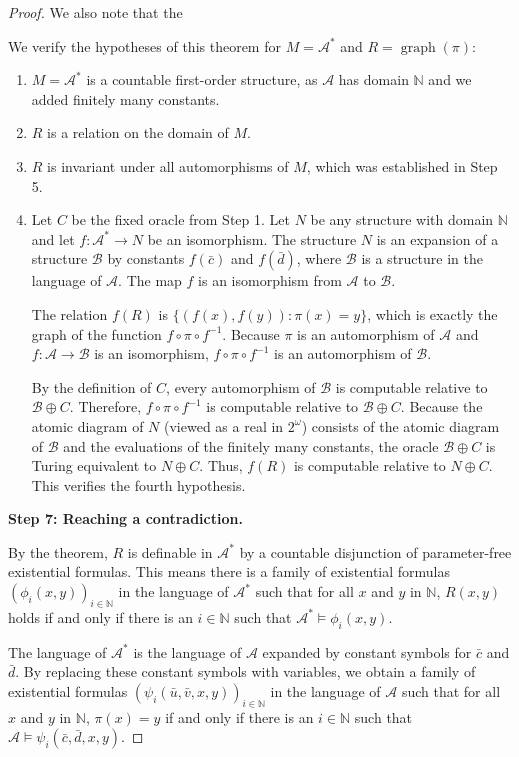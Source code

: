 \documentclass[12pt]{article}
\begin{document}
\begin{proof}
{We also note that the }

We verify the hypotheses of this theorem for $M = \mathcal{A}^*$ and $R = \operatorname{graph}(\pi)$:
\begin{enumerate}
\item $M = \mathcal{A}^*$ is a countable first-order structure, as $\mathcal{A}$ has domain $\mathbb{N}$ and we added finitely many constants.
\item $R$ is a relation on the domain of $M$.
\item $R$ is invariant under all automorphisms of $M$, which was established in Step 5.
\item Let $C$ be the fixed oracle from Step 1. Let $N$ be any structure with domain $\mathbb{N}$ and let $f: \mathcal{A}^* \to N$ be an isomorphism. The structure $N$ is an expansion of a structure $\mathcal{B}$ by constants $f(\bar{c})$ and $f(\bar{d})$, where $\mathcal{B}$ is a structure in the language of $\mathcal{A}$. The map $f$ is an isomorphism from $\mathcal{A}$ to $\mathcal{B}$. 

The relation $f(R)$ is $\{ (f(x), f(y)) : \pi(x) = y \}$, which is exactly the graph of the function $f \circ \pi \circ f^{-1}$. Because $\pi$ is an automorphism of $\mathcal{A}$ and $f: \mathcal{A} \to \mathcal{B}$ is an isomorphism, $f \circ \pi \circ f^{-1}$ is an automorphism of $\mathcal{B}$. 

By the definition of $C$, every automorphism of $\mathcal{B}$ is computable relative to $\mathcal{B} \oplus C$. Therefore, $f \circ \pi \circ f^{-1}$ is computable relative to $\mathcal{B} \oplus C$. Because the atomic diagram of $N$ (viewed as a real in $2^\omega$) consists of the atomic diagram of $\mathcal{B}$ and the evaluations of the finitely many constants, the oracle $\mathcal{B} \oplus C$ is Turing equivalent to $N \oplus C$. Thus, $f(R)$ is computable relative to $N \oplus C$. This verifies the fourth hypothesis.
\end{enumerate}

\textbf{Step 7: Reaching a contradiction.}

By the theorem, $R$ is definable in $\mathcal{A}^*$ by a countable disjunction of parameter-free existential formulas. This means there is a family of existential formulas $(\phi_i(x,y))_{i \in \mathbb{N}}$ in the language of $\mathcal{A}^*$ such that for all $x$ and $y$ in $\mathbb{N}$, $R(x, y)$ holds if and only if there is an $i \in \mathbb{N}$ such that $\mathcal{A}^* \models \phi_i(x, y)$.

The language of $\mathcal{A}^*$ is the language of $\mathcal{A}$ expanded by constant symbols for $\bar{c}$ and $\bar{d}$. By replacing these constant symbols with variables, we obtain a family of existential formulas $(\psi_i(\bar{u}, \bar{v}, x, y))_{i \in \mathbb{N}}$ in the language of $\mathcal{A}$ such that for all $x$ and $y$ in $\mathbb{N}$, $\pi(x) = y$ if and only if there is an $i \in \mathbb{N}$ such that $\mathcal{A} \models \psi_i(\bar{c}, \bar{d}, x, y)$.


\end{proof}
\end{document}
